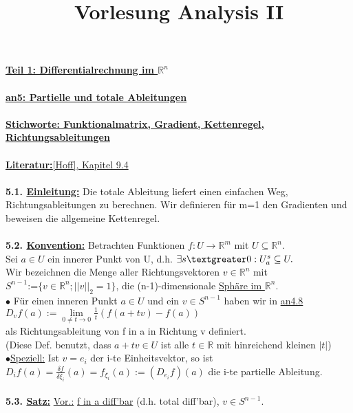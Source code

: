 \documentclass[]{scrartcl}
\title{Vorlesung Analysis II}
\begin{document}
	\maketitle
	\textbf{\underline{Teil 1: Differentialrechnung im $\mathbb{R}^n$}}\\
	\\
	\textbf{\underline{an5: Partielle und totale Ableitungen}}\\
	\\
	\textbf{\underline{\underline{Stichworte:} Funktionalmatrix, Gradient, 
	Kettenregel, Richtungsableitungen}}\\
	\\
	\textbf{\underline{Literatur:}}\ul{[Hoff], Kapitel 9.4}\\
	\\
	\textbf{5.1. \underline{Einleitung:}} Die totale Ableitung liefert einen 
	einfachen Weg, Richtungsableitungen zu berechnen. Wir definieren für m=1 
	den Gradienten und beweisen die allgemeine Kettenregel.\\
	\\
	\textbf{5.2. \underline{Konvention:}} Betrachten Funktionen 
	$f:U\rightarrow\mathbb{R}^m$ mit $U\subseteq \mathbb{R}^n$.\\
	Sei $a\in U$ ein innerer Punkt von U, d.h. $\exists s\textgreater0: 
	U_a^s\subseteq U.$\\
	Wir bezeichnen die Menge aller Richtungsvektoren $v\in \mathbb{R}^n$ mit \\
	\ul{$S^{n-1}$}:=$\{v\in \mathbb{R}^n; ||v||_2=1\}$, die 
	(n-1)-dimensionale \ul{Sphäre im $\mathbb{R}^n$}.\\
	$\bullet$ Für einen inneren Punkt $a\in U$ und ein $v\in S^{n-1}$ haben wir 
	in \ul{an4.8}\\
	$D_vf(a):=\lim\limits_{0\neq t\rightarrow0}\frac{1}{t}(f(a+tv)-f(a))$\\
	als Richtungsableitung von f in a in Richtung v definiert.\\
	(Diese Def. benutzt, dass $a+t v\in U$ ist alle $t\in\mathbb{R}$ mit 
	hinreichend kleinen $|t|$)\\
	$\bullet$\underline{Speziell:} Ist $v=e_i$ der i-te Einheitsvektor, so ist\\
	$D_if(a)=\frac{\delta f}{\delta \xi_i}(a)=f_{\xi_i}(a):=(D_{e_i}f)(a)$ die 
	i-te partielle Ableitung.\\
	\\
	\textbf{5.3. \underline{Satz:}} \underline{Vor.:} \ul{f 
	in a diff'bar} (d.h. total diff'bar), \ul{$v\in S^{n-1}$}.\\
\end{document}
